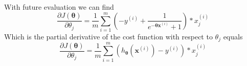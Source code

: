 With future evaluation we can find 
\begin{equation}
\label{eq:grad_cost_func_sol}
\frac{\partial J(\bm\theta)}{\partial \theta_{j}} =  \frac{1}{m}\sum_{i=1}^{m} ( - y^{(i)}  + \frac{1}{e^{- \bm\theta \bm x^{(i)} } + 1}) * x_{j}^{(i)}
\end{equation}
Which is the partial derivative of the cost function with respect to $\theta_{j}$ equals
\begin{equation}
\label{eq:grad_cost_func_sol}
\frac{\partial J(\bm\theta)}{\partial \theta_{j}} =  \frac{1}{m}\sum_{i=1}^{m} ( h_{\bm\theta}(\bm x^{(i)}) - y^{(i)}) * x_{j}^{(i)}
\end{equation}


